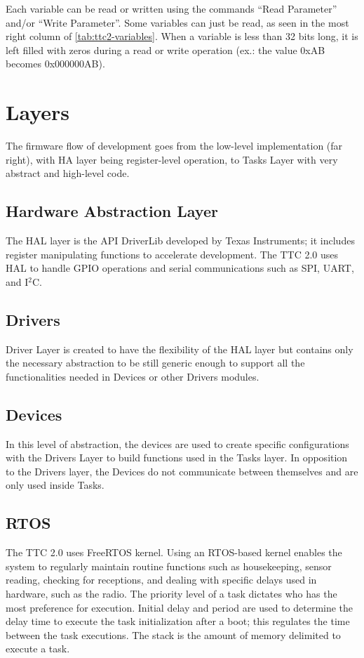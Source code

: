 Each variable can be read or written using the commands ``Read Parameter'' and/or ``Write Parameter''. Some variables can just be read, as seen in the most right column of \autoref{tab:ttc2-variables}. When a variable is less than 32 bits long, it is left filled with zeros during a read or write operation (ex.: the value 0xAB becomes 0x000000AB).

\section{Layers}

The firmware flow of development goes from the low-level implementation (far right), with HA layer being register-level operation, to Tasks Layer with very abstract and high-level code.

\subsection{Hardware Abstraction Layer}

The HAL layer is the API DriverLib developed by Texas Instruments; it includes register manipulating functions to accelerate development. The TTC 2.0 uses HAL to handle GPIO operations and serial communications such as SPI, UART, and I$^2$C.

\subsection{Drivers}

Driver Layer is created to have the flexibility of the HAL layer but contains only the necessary abstraction to be still generic enough to support all the functionalities needed in Devices or other Drivers modules.

\subsection{Devices}

In this level of abstraction, the devices are used to create specific configurations with the Drivers Layer to build functions used in the Tasks layer. In opposition to the Drivers layer, the Devices do not communicate between themselves and are only used inside Tasks.

\subsection{RTOS}

The TTC 2.0 uses FreeRTOS kernel. Using an RTOS-based kernel enables the system to regularly maintain routine functions such as housekeeping, sensor reading, checking for receptions, and dealing with specific delays used in hardware, such as the radio. The priority level of a task dictates who has the most preference for execution. Initial delay and period are used to determine the delay time to execute the task initialization after a boot; this regulates the time between the task executions. The stack is the amount of memory delimited to execute a task.

